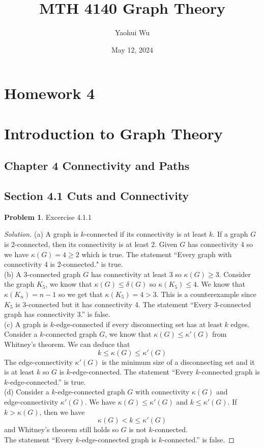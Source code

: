 \documentclass[12pt]{article}
\title{MTH 4140 Graph Theory}
\author{Yaohui Wu}
\date{May 12, 2024}
\theoremstyle{definition}
\newtheorem{problem}{Problem}
\newenvironment*{solution}{\begin{proof}[Solution]}{\end{proof}}
\begin{document}
\maketitle
\section*{Homework 4}
\section*{Introduction to Graph Theory}

\subsection*{Chapter 4 Connectivity and Paths}
\subsection*{Section 4.1 Cuts and Connectivity}
\begin{problem}
    Excercise 4.1.1
\end{problem}
\begin{solution}
    (a) A graph is \(k\)-connected if its connectivity is at least \(k\).
    If a graph \(G\) is 2-connected, then its connectivity is at least 2.
    Given \(G\) has connectivity 4 so we have \(\kappa(G)=4\geq2\) which is true.
    The statement ``Every graph with connectivity 4 is 2-connected." is true. \\
    (b) A 3-connected graph \(G\) has connectivity at least 3 so \(\kappa(G)\geq3\).
    Consider the graph \(K_5\), we know that \(\kappa(G)\leq\delta(G)\) so \(\kappa(K_5)\leq4\).
    We know that \(\kappa(K_n)=n-1\) so we get that \(\kappa(K_5)=4>3\).
    This is a counterexample since \(K_5\) is 3-connected but it has connectivity 4.
    The statement ``Every 3-connected graph has connectivity 3.'' is false. \\
    (c) A graph is \(k\)-edge-connected if every disconnecting set has at least \(k\) edges.
    Consider a \(k\)-connected graph \(G\), we know that \(\kappa(G)\leq\kappa'(G)\) from Whitney's theorem.
    We can deduce that \[k \leq \kappa(G) \leq \kappa'(G) \]
    The edge-connectivity \(\kappa'(G)\) is the minimum size of a disconnecting set and it is at least \(k\) so \(G\) is \(k\)-edge-connected.
    The statement ``Every \(k\)-connected graph is \(k\)-edge-connected.'' is true. \\
    (d) Consider a \(k\)-edge-connected graph \(G\) with connectivity \(\kappa(G)\) and \\ edge-connectivity \(\kappa'(G)\).
    We have \(\kappa(G)\leq\kappa'(G)\) and \(k\leq\kappa'(G)\).
    If \(k>\kappa(G)\), then we have \[\kappa(G)<k\leq\kappa'(G)\] and Whitney's theorem still holds so \(G\) is not \(k\)-connected. \\
    The statement ``Every \(k\)-edge-connected graph is \(k\)-connected.'' is false.
\end{solution}
\end{document}
